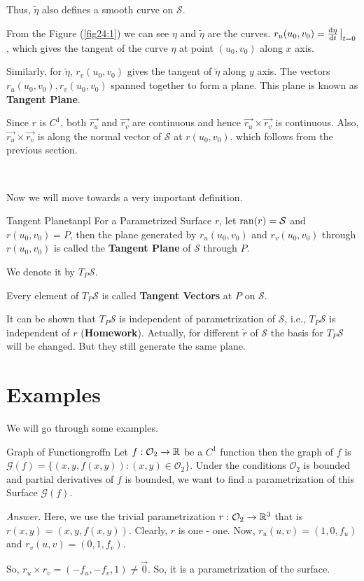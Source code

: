\documentclass[../Analysis-3]{subfiles}
\begin{document}
Thus, $\tilde{\eta}$ also defines a smooth curve on $\mathcal{S}$.

From the Figure (\ref{fig24:1}) we can see $\eta$ and $\tilde{\eta}$ are the curves. $r_u(u_0,v_0)=\dv{\eta}{t}\eval_{t=0}$, which gives the tangent of the curve $\eta$ at point $(u_0,v_0)$ along $x$ axis.

Similarly, for $\tilde{\eta}$, $r_v(u_0,v_0)$  gives the tangent of $\tilde{\eta}$ along $y$ axis. The vectors $r_u(u_0,v_0),r_v(u_0,v_0)$ spanned together to form a plane. This plane is known as \textbf{Tangent Plane}.

Since $r$ is $C^1$, both $\vec{r_u}$ and $\vec{r_v}$ are continuous and hence $\vec{r_u} \times \vec{r_v}$ is continuous. Also, $\vec{r_u} \times \vec{r_v}$ is along the normal vector of $\mathcal{S}$ at $r(u_0,v_0)$. which follows from the previous section.

\

Now we will move towards a very important definition.

\begin{Def}{Tangent Plane}{tanpl}
    For a Parametrized Surface $r$, let $\operatorname{ran}(r)=\mathcal{S}$ and $r(u_0,v_0)=P$, then the plane generated by $r_u(u_0,v_0)$ and $r_v(u_0,v_0)$ through $r(u_0,v_0)$ is called the \textbf{Tangent Plane} of $\mathcal{S}$ through $P$.

    We denote it by $T_P\mathcal{S}$.

    Every element of $T_P\mathcal{S}$ is called \textbf{Tangent Vectors} at $P$ on $\mathcal{S}$.
\end{Def}

It can be shown that $T_P\mathcal{S}$ is independent of parametrization of $\mathcal{S}$, i.e., $T_P\mathcal{S}$ is independent of $r$ (\textbf{Homework}). Actually, for different $\tilde{r}$ of $\mathcal{S}$ the basis for $T_P\mathcal{S}$ will be changed. But they still generate the same plane.

\section{Examples}

We will go through some examples.

\begin{Eg}{Graph of Function}{groffn}
    Let $f : \mathcal{O}_2 \to \mathbb{R}$ be a $C^1$ function then the graph of $f$ is $\mathcal{G}(f) = \{ (x,y,f(x,y)) : (x,y)\in \mathcal{O}_2\}$. Under the conditions $\mathcal{O}_2$ is bounded and partial derivatives of $f$ is bounded, we want to find a parametrization of this Surface $\mathcal{G}(f)$.

    \textit{Answer.} Here, we use the trivial parametrization $r : \mathcal{O}_2 \to \mathbb{R}^3$ that is $ r(x,y) = (x,y,f(x,y))$. Clearly, $r$ is one - one. Now, $r_u(u,v) = (1,0,f_u)$ and $r_v(u,v) = (0,1,f_v)$.

    So, $ r_u \times r_v = (-f_u,-f_v,1) \neq \vec{0}$. So, it is a parametrization of the surface.
\end{Eg}
\end{document}
